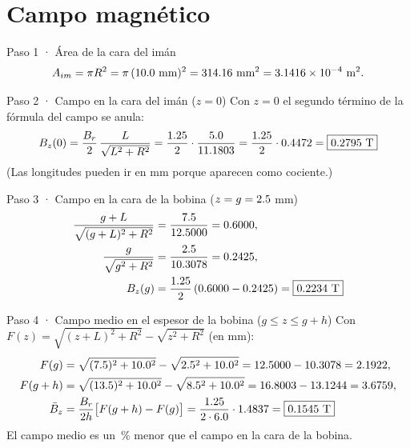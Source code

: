 \documentclass[11pt]{article}
\begin{document}
\section{Campo magnético}

\begin{paso}{Paso 1 · Área de la cara del imán}
\[
  A_{im}=\pi R^2=\pi\,(\ValRadioIman\ \text{mm})^2=\ValAreaImanMM\ \text{mm}^2=\ValAreaImanM\times10^{-4}\ \text{m}^2 .
\]
\end{paso}

\begin{paso}{Paso 2 · Campo en la cara del imán ($z=0$)}
Con $z=0$ el segundo término de la fórmula del campo se anula:
\[
  B_z(0)=\frac{B_r}{2}\,\frac{L}{\sqrt{L^2+R^2}}
  =\frac{1.25}{2}\cdot\frac{5.0}{11.1803}
  =\frac{1.25}{2}\cdot0.4472
  =\boxed{0.2795\ \text{T}}
\]
(Las longitudes pueden ir en mm porque aparecen como cociente.)
\end{paso}

\begin{paso}{Paso 3 · Campo en la cara de la bobina ($z=g=2.5$ mm)}
\begin{align*}
  \frac{g+L}{\sqrt{(g+L)^2+R^2}}&=\frac{\ValEntrehierroMasEspesor}{\ValRaizGL}=\ValTerminoUnoG,\\
  \frac{g}{\sqrt{g^2+R^2}}&=\frac{\ValEntrehierro}{\ValRaizG}=\ValTerminoDosG,\\
  B_z(g)&=\frac{\ValBr}{2}\left(\ValTerminoUnoG-\ValTerminoDosG\right)=\boxed{\ValCampoCaraBobina\ \text{T}}
\end{align*}
\end{paso}

\begin{paso}{Paso 4 · Campo medio en el espesor de la bobina ($g\le z\le g+h$)}
Con $F(z)=\sqrt{(z+L)^2+R^2}-\sqrt{z^2+R^2}$ (en mm):
\begin{align*}
  F(g)&=\sqrt{(7.5)^2+10.0^2}-\sqrt{2.5^2+10.0^2}
       =12.5000-10.3078=2.1922,\\
  F(g+h)&=\sqrt{(13.5)^2+10.0^2}-\sqrt{8.5^2+10.0^2}
       =16.8003-13.1244=3.6759,\\
  \bar B_z&=\frac{B_r}{2h}\big[F(g+h)-F(g)\big]=\frac{1.25}{2\cdot6.0}\cdot1.4837
          =\boxed{0.1545\ \text{T}}
\end{align*}
El campo medio es un \ValReduccionPorPromedio\,\% menor que el campo en la cara de la bobina.
\end{paso}
\end{document}

